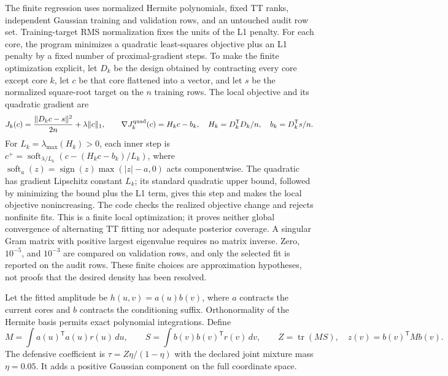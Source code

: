 \documentclass[11pt]{article}
\begin{document}
The finite regression uses normalized Hermite polynomials, fixed TT ranks,
independent Gaussian training and validation rows, and an untouched audit row
set. Training-target RMS normalization fixes the units of the L1 penalty.
For each core, the program minimizes a quadratic least-squares objective plus
an L1 penalty by a fixed number of proximal-gradient steps. To make the finite
optimization explicit, let $D_k$ be the design obtained by contracting every
core except core $k$, let $c$ be that core flattened into a vector, and let
$s$ be the normalized square-root target on the $n$ training rows. The local
objective and its quadratic gradient are
\begin{equation}
 J_k(c)=\frac{\|D_kc-s\|^2}{2n}+\lambda\|c\|_1,
 \qquad \nabla J_k^{\rm quad}(c)=H_kc-b_k,
 \quad H_k=D_k^{\mathsf T}D_k/n,\quad b_k=D_k^{\mathsf T}s/n.
 \label{eq:exec-core-objective}
\end{equation}
For $L_k=\lambda_{\max}(H_k)>0$, each inner step is
$c^+=\operatorname{soft}_{\lambda/L_k}(c-(H_kc-b_k)/L_k)$,
where $\operatorname{soft}_a(z)=\operatorname{sign}(z)\max(|z|-a,0)$
acts componentwise. The quadratic has gradient Lipschitz constant $L_k$;
its standard quadratic upper bound, followed by minimizing the bound plus
the L1 term, gives this step and makes the local objective nonincreasing.
The code checks the realized objective change and rejects nonfinite fits.
This is a finite local optimization; it proves neither global convergence
of alternating TT fitting nor adequate posterior coverage. A singular Gram
matrix with positive largest eigenvalue requires no matrix inverse.
Zero, $10^{-5}$, and
$10^{-3}$ are compared on validation rows, and only the selected fit is
reported on the audit rows. These finite choices are approximation hypotheses,
not proofs that the desired density has been resolved.

Let the fitted amplitude be $h(u,v)=a(u)b(v)$, where $a$ contracts the current
cores and $b$ contracts the conditioning suffix. Orthonormality of the
Hermite basis permits exact polynomial integrations. Define
\[
 M=\int a(u)^{\mathsf T}a(u)r(u)\,du,\qquad
 S=\int b(v)b(v)^{\mathsf T}r(v)\,dv,\qquad
 Z=\operatorname{tr}(MS),\quad z(v)=b(v)^{\mathsf T}M b(v).
\]
The defensive coefficient is $\tau=Z\eta/(1-\eta)$ with the declared joint
mixture mass $\eta=0.05$. It adds a positive Gaussian component on the full
coordinate space.
\end{document}
